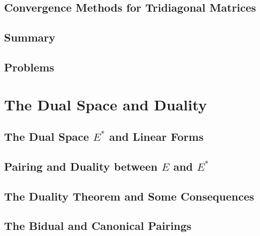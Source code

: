 \documentclass[a4paper]{article}
\begin{document}
\subsection{ Convergence Methods for Tridiagonal Matrices} %

\subsection{ Summary} %

\subsection{ Problems} %


\newpage
\section{The Dual Space and Duality}
\subsection{ The Dual Space $E^*$ and Linear Forms} %

\subsection{ Pairing and Duality between $E$ and $E^*$} %

\subsection{ The Duality Theorem and Some Consequences} %

\subsection{ The Bidual and Canonical Pairings} %
\end{document}
